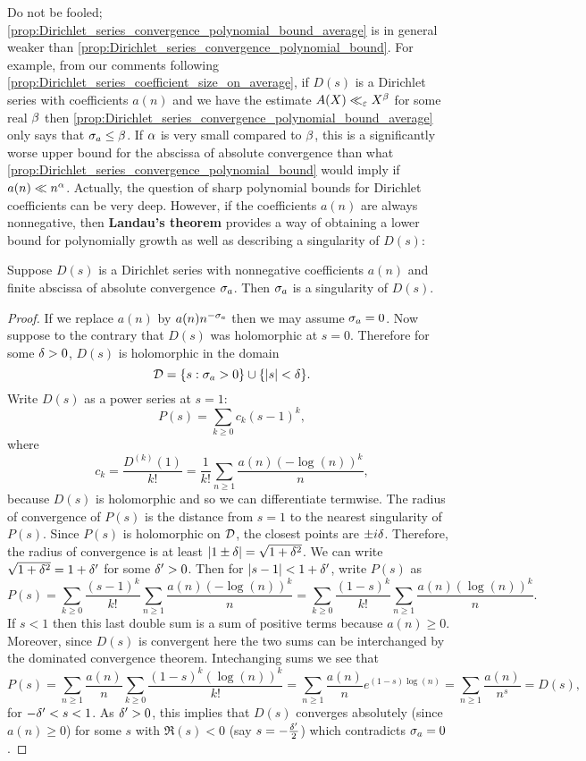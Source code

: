       Do not be fooled; \cref{prop:Dirichlet_series_convergence_polynomial_bound_average} is in general weaker than \cref{prop:Dirichlet_series_convergence_polynomial_bound}. For example, from our comments following \cref{prop:Dirichlet_series_coefficient_size_on_average}, if $D(s)$ is a Dirichlet series with coefficients $a(n)$ and we have the estimate $A(X) \ll_{\varepsilon} X^{\beta}$ for some real $\beta$ then \cref{prop:Dirichlet_series_convergence_polynomial_bound_average} only says that $\sigma_{a} \le \beta$. If $\alpha$ is very small compared to $\beta$, this is a significantly worse upper bound for the abscissa of absolute convergence than what \cref{prop:Dirichlet_series_convergence_polynomial_bound} would imply if $a(n) \ll n^{\alpha}$. Actually, the question of sharp polynomial bounds for Dirichlet coefficients can be very deep. However, if the coefficients $a(n)$ are always nonnegative, then \textbf{Landau's theorem} provides a way of obtaining a lower bound for polynomially growth as well as describing a singularity of $D(s)$:

      \begin{theorem}
        Suppose $D(s)$ is a Dirichlet series with nonnegative coefficients $a(n)$ and finite abscissa of absolute convergence $\sigma_{a}$. Then $\sigma_{a}$ is a singularity of $D(s)$.
      \end{theorem}
      \begin{proof}
        If we replace $a(n)$ by $a(n)n^{-\sigma_{a}}$ then we may assume $\sigma_{a} = 0$. Now suppose to the contrary that $D(s)$ was holomorphic at $s = 0$. Therefore for some $\delta > 0$, $D(s)$ is holomorphic in the domain
        \[
          \mathcal{D} = \{s:\sigma_{a} > 0\} \cup \{|s| < \delta\}.
        \]
        Write $D(s)$ as a power series at $s = 1$:
        \[
          P(s) = \sum_{k \ge 0}c_{k}(s-1)^{k},
        \]
        where
        \[
          c_{k} = \frac{D^{(k)}(1)}{k!} = \frac{1}{k!}\sum_{n \ge 1}\frac{a(n)(-\log(n))^{k}}{n},
        \]
        because $D(s)$ is holomorphic and so we can differentiate termwise. The radius of convergence of $P(s)$ is the distance from $s = 1$ to the nearest singularity of $P(s)$. Since $P(s)$ is holomorphic on $\mathcal{D}$, the closest points are $\pm i\delta$. Therefore, the radius of convergence is at least $|1\pm\delta| = \sqrt{1+\delta^{2}}$. We can write $\sqrt{1+\delta^{2}} = 1+\delta'$ for some $\delta' > 0$. Then for $|s-1| < 1+\delta'$, write $P(s)$ as
        \[
          P(s) = \sum_{k \ge 0}\frac{(s-1)^{k}}{k!}\sum_{n \ge 1}\frac{a(n)(-\log(n))^{k}}{n} = \sum_{k \ge 0}\frac{(1-s)^{k}}{k!}\sum_{n \ge 1}\frac{a(n)(\log(n))^{k}}{n}.
        \]
        If $s < 1$ then this last double sum is a sum of positive terms because $a(n) \ge 0$. Moreover, since $D(s)$ is convergent here the two sums can be interchanged by the dominated convergence theorem. Intechanging sums we see that
        \[
          P(s) = \sum_{n \ge 1}\frac{a(n)}{n}\sum_{k \ge 0}\frac{(1-s)^{k}(\log(n))^{k}}{k!} = \sum_{n \ge 1}\frac{a(n)}{n}e^{(1-s)\log(n)} = \sum_{n \ge 1}\frac{a(n)}{n^{s}} = D(s),
        \]
        for $-\delta' < s < 1$. As $\delta' > 0$, this implies that $D(s)$ converges absolutely (since $a(n) \ge 0$) for some $s$ with $\Re(s) < 0$ (say $s = -\frac{\delta'}{2}$) which contradicts $\sigma_{a} = 0$.
      \end{proof}


